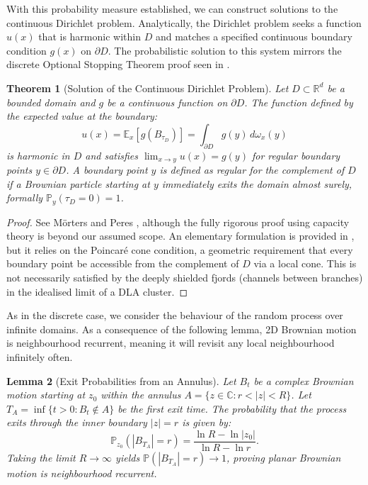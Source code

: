 \documentclass[12pt, a4paper, oneside]{report}
\newtheorem{theorem}{Theorem}[chapter]
\newtheorem{lemma}[theorem]{Lemma}
\theoremstyle{remark}
\begin{document}
With this probability measure established, we can construct solutions to the continuous Dirichlet problem. Analytically, the Dirichlet problem seeks a function $u(x)$ that is harmonic within $D$ and matches a specified continuous boundary condition $g(x)$ on $\partial D$. The probabilistic solution to this system mirrors the discrete Optional Stopping Theorem proof seen in .

\begin{theorem}[Solution of the Continuous Dirichlet Problem]
    \label{the:dirichlet_solution}
Let $D \subset \mathbb{R}^d$ be a bounded domain and $g$ be a continuous function on $\partial D$. The function defined by the expected value at the boundary:
\begin{equation*}
    u(x) = \mathbb{E}_x[g(B_{\tau_D})] = \int_{\partial D} g(y) \, d\omega_x(y)
\end{equation*}
is harmonic in $D$ and satisfies $\lim_{x \to y} u(x) = g(y)$ for regular boundary points $y \in \partial D$. A boundary point $y$ is defined as regular for the complement of $D$ if a Brownian particle starting at $y$ immediately exits the domain almost surely, formally $\mathbb{P}_y(\tau_D = 0) = 1$.
\end{theorem}

\begin{proof}
See M{\"o}rters and Peres \cite[Theorem 8.5(b)]{Morters2010}, although the fully rigorous proof using capacity theory is beyond our assumed scope. An elementary formulation is provided in \cite[Theorem 3.12]{Morters2010}, but it relies on the Poincar\'e cone condition, a geometric requirement that every boundary point be accessible from the complement of $D$ via a local cone. This is not necessarily satisfied by the deeply shielded fjords (channels between branches) in the idealised limit of a DLA cluster.
\end{proof}

As in the discrete case, we consider the behaviour of the random process over infinite domains. As a consequence of the following lemma, 2D Brownian motion is neighbourhood recurrent, meaning it will revisit any local neighbourhood infinitely often.

\begin{lemma}[Exit Probabilities from an Annulus]
Let $B_t$ be a complex Brownian motion starting at $z_0$ within the annulus $A = \{z \in \mathbb{C} : r < |z| < R\}$. Let $T_A = \inf\{t > 0 : B_t \notin A\}$ be the first exit time. The probability that the process exits through the inner boundary $|z|=r$ is given by:
\begin{equation*}
    \mathbb{P}_{z_0}(|B_{T_A}| = r) = \frac{\ln R - \ln |z_0|}{\ln R - \ln r}.
\end{equation*}
Taking the limit $R \to \infty$ yields $\mathbb{P}(|B_{T_A}| = r) \to 1$, proving planar Brownian motion is neighbourhood recurrent.
\end{lemma}
\end{document}
